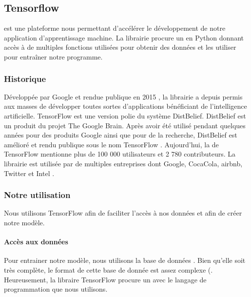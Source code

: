 \documentclass[letterpaper,10pt,french]{sphinxmanual}
\begin{document}
\subsection{Tensorflow}
\label{\detokenize{explications_librairies:tensorflow}}
 est une plateforme nous permettant d’accélérer
le développement de notre application d’apprentissage machine. La librairie
procure un  en Python donnant accès
à de multiples fonctions utilisées pour obtenir des données et les utiliser
pour entraîner notre programme.


\subsubsection{Historique}
\label{\detokenize{explications_librairies:historique}}
Développée par Google et rendue publique en 2015 , la librairie
a depuis permis aux masses de développer toutes sortes d’applications
bénéficiant de l’intelligence artificielle. TensorFlow est une version polie
du système DistBelief. DistBelief est un produit du projet The Google Brain.
Après avoir été utilisé pendant quelques années pour des produits Google ainsi
que pour de la recherche, DistBelief est amélioré et rendu publique sous le
nom TensorFlow . Aujourd’hui, la
 de TensorFlow mentionne
plus de 100 000 utilisateurs et 2 780 contributeurs. La librairie est utilisée
par de multiples entreprises dont Google, Coca\sphinxhyphen{}Cola, airbnb, Twitter et Intel
.


\subsubsection{Notre utilisation}
\label{\detokenize{explications_librairies:notre-utilisation}}
Nous utilisons TensorFlow afin de faciliter l’accès à nos données et afin
de créer notre modèle.


\paragraph{Accès aux données}
\label{\detokenize{explications_librairies:acces-aux-donnees}}
Pour entrainer notre modèle, nous utilisons la base de données
. Bien qu’elle soit très complète,
le format de cette base de donnée est assez complexe
(. Heureusement,
la libraire TensorFlow procure un
avec le langage de programmation que nous utilisons.
\end{document}
